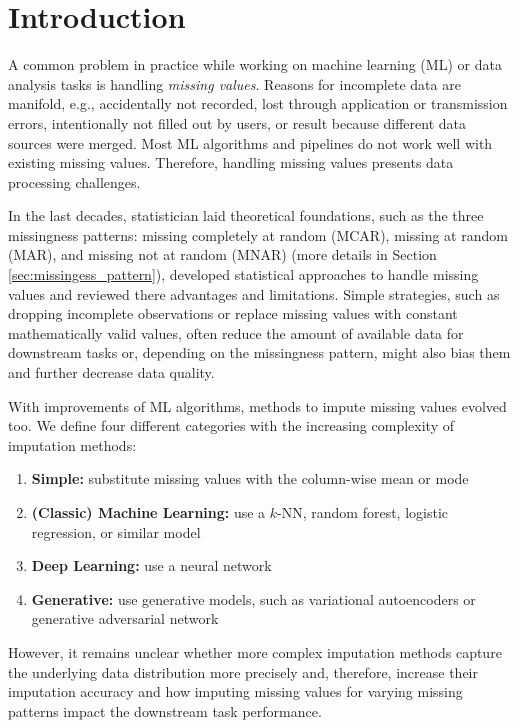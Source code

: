 \section{Introduction}
\label{sec:introduction}

A common problem in practice while working on machine learning (ML) or data analysis tasks is handling \emph{missing values}. Reasons for incomplete data are manifold, e.g., accidentally not recorded, lost through application or transmission errors, intentionally not filled out by users, or result because different data sources were merged. Most ML algorithms and pipelines do not work well with existing missing values. Therefore, handling missing values presents data processing challenges.

In the last decades, statistician laid theoretical foundations, such as the three missingness patterns: missing completely at random (MCAR), missing at random (MAR), and missing not at random (MNAR) (more details in Section \ref{sec:missingess_pattern}), developed statistical approaches to handle missing values and reviewed there advantages and limitations. Simple strategies, such as dropping incomplete observations or replace missing values with constant mathematically valid values, often reduce the amount of available data for downstream tasks or, depending on the missingness pattern, might also bias them and further decrease data quality.

With improvements of ML algorithms, methods to impute missing values evolved too. We define four different categories with the increasing complexity of imputation methods:
%
\begin{enumerate}
	\item \textbf{Simple:} substitute missing values with the column-wise mean or mode
	\item \textbf{(Classic) Machine Learning:} use a $k$-NN, random forest, logistic regression, or similar model
	\item \textbf{Deep Learning:} use a neural network
	\item \textbf{Generative:} use generative models, such as variational autoencoders or generative adversarial network
\end{enumerate}
%
However, it remains unclear whether more complex imputation methods capture the underlying data distribution more precisely and, therefore, increase their imputation accuracy and how imputing missing values for varying missing patterns impact the downstream task performance.

